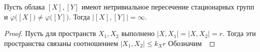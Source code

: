 \begin{theorem}
  Пусть облака $[X],[Y]$ имеют нетривиальное пересечение стационарных групп и $\varphi\big([X]\big)\neq \varphi\big([Y]\big)$. Тогда $\big|[X],[Y]\big|=\infty$.
\end{theorem}

\begin{proof}
  Пусть для пространств $ X_1,X_2 $ выполнено $ |X,X_1|=|X,X_2| = r $. Тогда эти пространства связаны соотношением $ |X_1,X_2|\le k_Xr   $ 
  Обозначим $ \ $
\end{proof}

  

